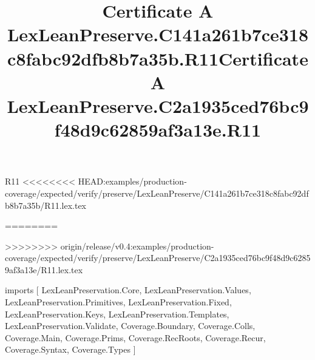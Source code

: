 \begin{lexlean}{R11}
<<<<<<<< HEAD:examples/production-coverage/expected/verify/preserve/LexLeanPreserve/C141a261b7ce318c8fabc92dfb8b7a35b/R11.lex.tex
\title{Certificate A LexLeanPreserve.C141a261b7ce318c8fabc92dfb8b7a35b.R11}
========
\title{Certificate A LexLeanPreserve.C2a1935ced76bc9f48d9c62859af3a13e.R11}
>>>>>>>> origin/release/v0.4:examples/production-coverage/expected/verify/preserve/LexLeanPreserve/C2a1935ced76bc9f48d9c62859af3a13e/R11.lex.tex
\begin{coremodule}
imports [
  LexLeanPreservation.Core,
  LexLeanPreservation.Values,
  LexLeanPreservation.Primitives,
  LexLeanPreservation.Fixed,
  LexLeanPreservation.Keys,
  LexLeanPreservation.Templates,
  LexLeanPreservation.Validate,
  Coverage.Boundary,
  Coverage.Colls,
  Coverage.Main,
  Coverage.Prims,
  Coverage.RecRoots,
  Coverage.Recur,
  Coverage.Syntax,
  Coverage.Types
]


\end{coremodule}
\end{lexlean}
